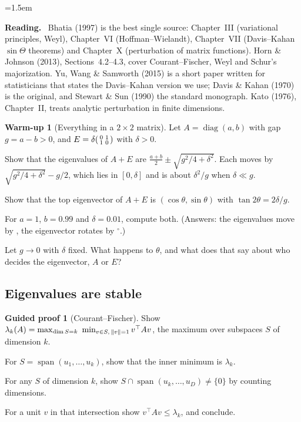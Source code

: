 \documentclass[11pt,a4paper]{article}
\DeclareMathOperator{\diag}{diag}
\DeclareMathOperator{\spn}{span}
\DeclarePairedDelimiter{\norm}{\lVert}{\rVert}
\theoremstyle{plain}
\theoremstyle{definition}
\newtheorem{warmup}[proposition]{Warm-up}
\newtheorem{guided}[proposition]{Guided proof}
\theoremstyle{remark}
\newenvironment{reading}{\begin{list}{}{\leftmargin=1.5em\rightmargin=0pt\topsep=6pt}\small\item[]%
  \textcolor{blue!50!black}{\textbf{Reading.}}\ }{\end{list}}
\begin{document}
\begin{reading}
Bhatia (1997) is the best single source: Chapter~III (variational principles, Weyl), Chapter~VI (Hoffman--Wielandt),
Chapter~VII (Davis--Kahan $\sin\Theta$ theorems) and Chapter~X (perturbation of matrix functions). Horn \& Johnson
(2013), Sections~4.2--4.3, cover Courant--Fischer, Weyl and Schur's majorization. Yu, Wang \& Samworth (2015) is a
short paper written for statisticians that states the Davis--Kahan version we use; Davis \& Kahan (1970) is the
original, and Stewart \& Sun (1990) the standard monograph. Kato (1976), Chapter~II, treats analytic perturbation in
finite dimensions.
\end{reading}

\begin{warmup}[Everything in a $2\times2$ matrix]\label{wu:twobytwo}
Let $A=\diag(a,b)$ with gap $g=a-b>0$, and $E=\delta\begin{psmallmatrix}0&1\\1&0\end{psmallmatrix}$ with $\delta>0$.
\begin{steps}
\item Show that the eigenvalues of $A+E$ are $\frac{a+b}2\pm\sqrt{g^2/4+\delta^2}$. Each moves by
  $\sqrt{g^2/4+\delta^2}-g/2$, which lies in $[0,\delta]$ and is about $\delta^2/g$ when $\delta\ll g$.
\item Show that the top eigenvector of $A+E$ is $(\cos\theta,\sin\theta)$ with $\tan2\theta=2\delta/g$.
\item For $a=1$, $b=0.99$ and $\delta=0.01$, compute both. (Answers: the eigenvalues move by \NumTwoShift, the
  eigenvector rotates by \NumTwoAngle$^\circ$.)
\item Let $g\to0$ with $\delta$ fixed. What happens to $\theta$, and what does that say about who decides the
  eigenvector, $A$ or $E$?
\end{steps}
\end{warmup}

\subsection{Eigenvalues are stable}

\begin{guided}[Courant--Fischer]\label{gp:courant}
Show $\lambda_k(A)=\max_{\dim S=k}\ \min_{v\in S,\,\norm{v}=1}v^\top Av$, the maximum over subspaces $S$ of dimension $k$.
\begin{steps}
\item For $S=\spn(u_1,\dots,u_k)$, show that the inner minimum is $\lambda_k$.
\item For any $S$ of dimension $k$, show $S\cap\spn(u_k,\dots,u_D)\ne\{0\}$ by counting dimensions.
\item For a unit $v$ in that intersection show $v^\top Av\le\lambda_k$, and conclude.
\end{steps}
\end{guided}
\end{document}
